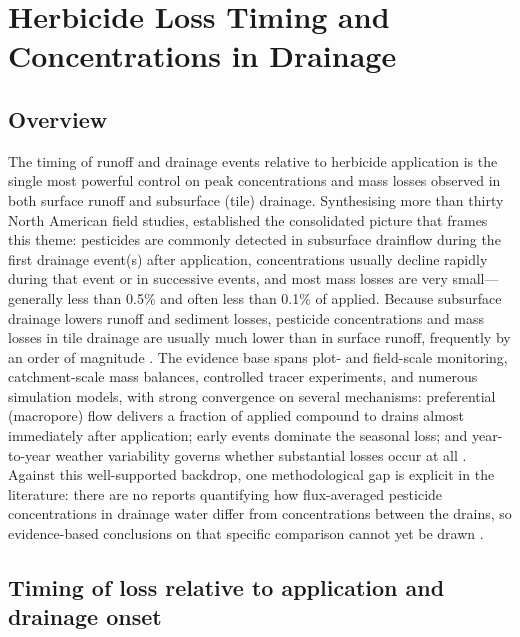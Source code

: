 \documentclass[11pt]{article}
\begin{document}
\section*{Herbicide Loss Timing and Concentrations in Drainage}

\subsection{Overview}
The timing of runoff and drainage events relative to herbicide application is the single most powerful control on peak concentrations and mass losses observed in both surface runoff and subsurface (tile) drainage. Synthesising more than thirty North American field studies, \textcite{Kladivko2001} established the consolidated picture that frames this theme: pesticides are commonly detected in subsurface drainflow during the first drainage event(s) after application, concentrations usually decline rapidly during that event or in successive events, and most mass losses are very small---generally less than 0.5\% and often less than 0.1\% of applied. Because subsurface drainage lowers runoff and sediment losses, pesticide concentrations and mass losses in tile drainage are usually much lower than in surface runoff, frequently by an order of magnitude \parencite{Kladivko2001}. The evidence base spans plot- and field-scale monitoring, catchment-scale mass balances, controlled tracer experiments, and numerous simulation models, with strong convergence on several mechanisms: preferential (macropore) flow delivers a fraction of applied compound to drains almost immediately after application; early events dominate the seasonal loss; and year-to-year weather variability governs whether substantial losses occur at all \parencite{Kladivko2001}. Against this well-supported backdrop, one methodological gap is explicit in the literature: there are no reports quantifying how flux-averaged pesticide concentrations in drainage water differ from concentrations between the drains, so evidence-based conclusions on that specific comparison cannot yet be drawn \parencite{Jacobsen2007}.

\subsection{Timing of loss relative to application and drainage onset}
\end{document}
